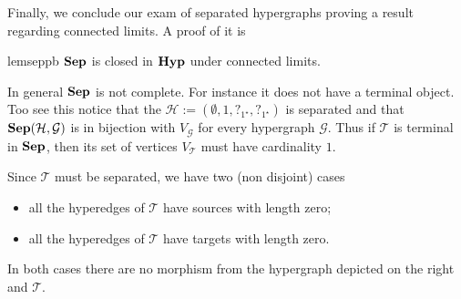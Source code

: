 \documentclass[3p]{elsarticle}
\newcommand{\catname}[1]{\textbf{\textup{#1}}}
\newcommand{\hyp}{\catname{Hyp}}
\newcommand{\shyp}{\catname{Sep}}
\theoremstyle{remark}
\theoremstyle{definition}
\begin{document}
Finally, we conclude our exam of separated hypergraphs proving a result regarding connected limits. A proof of it is 

\begin{restatable}{lem}{seppb}\label{lem:seplim}
	$\shyp$ is closed in $\hyp$ under connected limits.
\end{restatable}



\begin{exa}\label{ex:noterm}
In general $\shyp$ is not complete. For instance it does not have a terminal object. Too see this notice that the $\mathcal{H}:=(\emptyset, 1, ?_{1^\star}, ?_{1^\star} )$ is separated and that 
$\shyp(\mathcal{H}, \mathcal{G})$ is in bijection with $V_{\mathcal{G}}$ for every hypergraph $\mathcal{G}$. Thus if  $\mathcal{T}$ is terminal in $\shyp$, then its set of vertices $V_{\mathcal{T}}$ must have cardinality $1$. 

\smallskip
Since $\mathcal{T}$ must be separated, we have two (non disjoint) cases

\medskip
\begin{minipage}[l]{.65\linewidth}
	\begin{itemize}
		\item  all the hyperedges of $\mathcal{T}$ have sources with length zero; 
		\item all the hyperedges of $\mathcal{T}$ have targets with length zero.
	\end{itemize}
\end{minipage}
\begin{minipage}[r]{.15\linewidth}
\vspace{-.5cm}
\end{minipage}

\medskip
In both cases there are no morphism from the hypergraph depicted on the right and $\mathcal{T}$.
\end{exa}
\end{document}

